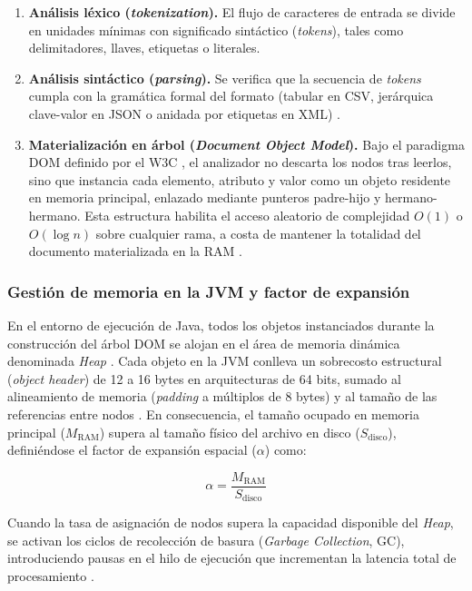 \begin{enumerate}
    \item \textbf{Análisis léxico (\textit{tokenization}).} El flujo de caracteres de entrada se divide en unidades mínimas con significado sintáctico (\textit{tokens}), tales como delimitadores, llaves, etiquetas o literales.
    \item \textbf{Análisis sintáctico (\textit{parsing}).} Se verifica que la secuencia de \textit{tokens} cumpla con la gramática formal del formato (tabular en CSV, jerárquica clave-valor en JSON o anidada por etiquetas en XML) \cite{shafranovich2005, bray1998, bray2017}.
    \item \textbf{Materialización en árbol (\textit{Document Object Model}).} Bajo el paradigma DOM definido por el W3C \cite{w3cdom2004}, el analizador no descarta los nodos tras leerlos, sino que instancia cada elemento, atributo y valor como un objeto residente en memoria principal, enlazado mediante punteros padre-hijo y hermano-hermano. Esta estructura habilita el acceso aleatorio de complejidad $O(1)$ o $O(\log n)$ sobre cualquier rama, a costa de mantener la totalidad del documento materializada en la RAM \cite{dke_memory_2006}.
\end{enumerate}

\subsubsection{Gestión de memoria en la JVM y factor de expansión}

En el entorno de ejecución de Java, todos los objetos instanciados durante la construcción del árbol DOM se alojan en el área de memoria dinámica denominada \textit{Heap} \cite{oracle_jvm_spec}. Cada objeto en la JVM conlleva un sobrecosto estructural (\textit{object header}) de 12 a 16 bytes en arquitecturas de 64 bits, sumado al alineamiento de memoria (\textit{padding} a múltiplos de 8 bytes) y al tamaño de las referencias entre nodos \cite{oracle_jvm_spec}. En consecuencia, el tamaño ocupado en memoria principal ($M_{\text{RAM}}$) supera al tamaño físico del archivo en disco ($S_{\text{disco}}$), definiéndose el factor de expansión espacial ($\alpha$) como:

\begin{equation}
\alpha = \frac{M_{\text{RAM}}}{S_{\text{disco}}}
\end{equation}

Cuando la tasa de asignación de nodos supera la capacidad disponible del \textit{Heap}, se activan los ciclos de recolección de basura (\textit{Garbage Collection}, GC), introduciendo pausas en el hilo de ejecución que incrementan la latencia total de procesamiento \cite{dke_memory_2006, smith2002performance}.


